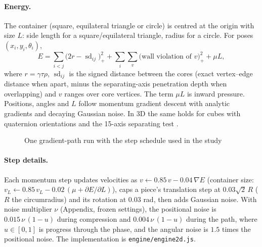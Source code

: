 \paragraph{Energy.} The container (square, equilateral triangle or circle) is centred at the origin with size $L$: side length for a square/equilateral triangle, radius for a circle. For poses $(x_i,y_i,\theta_i)$,
\[
E=\sum_{i<j}\big(2r-\operatorname{sd}_{ij}\big)_+^2+\sum_{i}\sum_{v}\big(\text{wall violation of }v\big)_+^2+\mu L,
\]
where $r=\gamma\tau\rho$, $\operatorname{sd}_{ij}$ is the signed distance between the cores (exact vertex--edge distance when apart, minus the separating-axis penetration depth when overlapping) and $v$ ranges over core vertices. The term $\mu L$ is inward pressure. Positions, angles and $L$ follow momentum gradient descent with analytic gradients and decaying Gaussian noise. In 3D the same holds for cubes with quaternion orientations and the 15-axis separating test \citep{softtorigidpacking}.

\begin{figure}[t]
\centering{}
\caption{One gradient-path run with the step schedule used in the study}\label{alg:run}
\end{figure}

\paragraph{Step details.} Each momentum step updates velocities as $v\leftarrow0.85\,v-0.04\,\nabla E$ (container size: $v_L\leftarrow0.85\,v_L-0.02\,(\mu+\partial E/\partial L)$), caps a piece's translation step at $0.03\sqrt2\,R$ ($R$ the circumradius) and its rotation at $0.03$ rad, then adds Gaussian noise. With noise multiplier $\nu$ (Appendix, frozen settings), the positional noise is $0.015\,\nu\,(1-u)$ during compression and $0.004\,\nu\,(1-u)$ during the path, where $u\in[0,1]$ is progress through the phase, and the angular noise is $1.5$ times the positional noise. The implementation is \texttt{engine/engine2d.js}.

